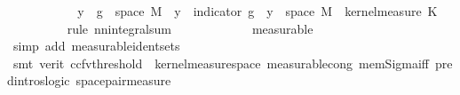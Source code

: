 \begin{isabellebody}
\ \ \ \ \ \ \isamarkupfalse%
\ \isamarkupfalse%
\ {\isachardoublequoteopen}{\isachardot}{\kern0pt}{\isachardot}{\kern0pt}{\isachardot}{\kern0pt}\ {\isacharequal}{\kern0pt}\ {\isacharparenleft}{\kern0pt}{\isasymSum}y\ {\isasymin}\ g\ {\isacharbackquote}{\kern0pt}\ space\ {\isacharquery}{\kern0pt}M{\isachardot}{\kern0pt}\ {\isacharparenleft}{\kern0pt}{\isasymintegral}\isactrlsup {\isacharplus}{\kern0pt}{\isasymomega}\ y\ {\isacharasterisk}{\kern0pt}\ {\isacharparenleft}{\kern0pt}indicator\ {\isacharparenleft}{\kern0pt}g\ {\isacharminus}{\kern0pt}{\isacharbackquote}{\kern0pt}\ {\isacharbraceleft}{\kern0pt}y{\isacharbraceright}{\kern0pt}\ {\isasyminter}\ space\ {\isacharquery}{\kern0pt}M{\isacharparenright}{\kern0pt}{\isacharparenleft}{\kern0pt}{\isasymomega}\ {\isasymomega}\ {\isasympartial}kernel{\isacharunderscore}{\kern0pt}measure\ K\ {\isasymomega}\isanewline
\ \ \ \ \ \ \ \ \isamarkupfalse%
\ {\isacharparenleft}{\kern0pt}rule\ nn{\isacharunderscore}{\kern0pt}integral{\isacharunderscore}{\kern0pt}sum{\isacharparenright}{\kern0pt}\isanewline
\ \ \ \ \ \ \ \ \isamarkupfalse%
\ {\isacharasterisk}{\kern0pt}\ \isamarkupfalse%
\ measurable\isanewline
\ \ \ \ \ \ \ \ \isamarkupfalse%
\ {\isacharparenleft}{\kern0pt}simp\ add{\isacharcolon}{\kern0pt}\ measurable{\isacharunderscore}{\kern0pt}ident{\isacharunderscore}{\kern0pt}sets{\isacharparenright}{\kern0pt}\isanewline
\ \ \ \ \ \ \ \ \isamarkupfalse%
\ {\isacharparenleft}{\kern0pt}smt\ {\isacharparenleft}{\kern0pt}verit{\isacharcomma}{\kern0pt}\ ccfv{\isacharunderscore}{\kern0pt}threshold{\isacharparenright}{\kern0pt}\ {\isachardoublequoteopen}{\isacharasterisk}{\kern0pt}{\isachardoublequoteclose}\ kernel{\isacharunderscore}{\kern0pt}measure{\isacharunderscore}{\kern0pt}space\ measurable{\isacharunderscore}{\kern0pt}cong\ mem{\isacharunderscore}{\kern0pt}Sigma{\isacharunderscore}{\kern0pt}iff\ pred{\isacharunderscore}{\kern0pt}intros{\isacharunderscore}{\kern0pt}logic{\isacharparenleft}{\kern0pt}{}{\isacharparenright}{\kern0pt}\ space{\isacharunderscore}{\kern0pt}pair{\isacharunderscore}{\kern0pt}measure{\isacharparenright}{\kern0pt}\isanewline
\ \ \ \ \ \ \ \ \isamarkupfalse%

\end{isabellebody}
